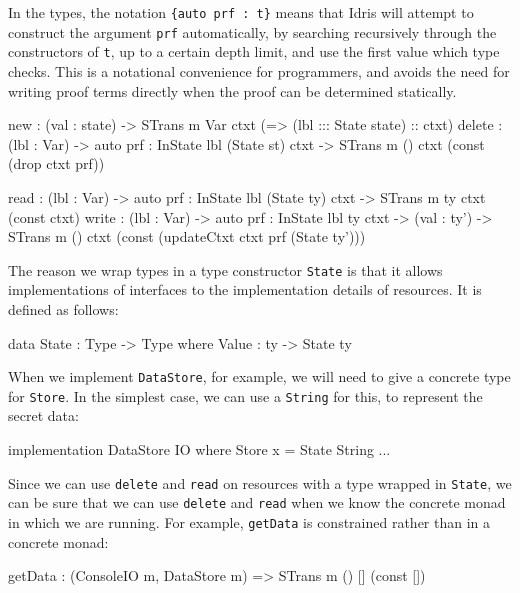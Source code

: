 In the types, the notation \texttt{\{auto prf : t\}} means that Idris will
attempt to construct the argument \texttt{prf} automatically, by searching
recursively through the constructors of \texttt{t}, up to a certain depth
limit, and use the first value which type checks. This is a notational
convenience for programmers, and avoids the need for writing proof terms
directly when the proof can be determined statically.

\small
\begin{code}[float=h, frame=single,caption={Primitive operations in
\texttt{STrans} for creating, deleting, reading and writing resources},label=fig:stransprims]
new : (val : state) -> 
      STrans m Var ctxt (\lbl => (lbl ::: State state) :: ctxt)
delete : (lbl : Var) ->
         {auto prf : InState lbl (State st) ctxt} ->
         STrans m () ctxt (const (drop ctxt prf))

read : (lbl : Var) ->
       {auto prf : InState lbl (State ty) ctxt} ->
       STrans m ty ctxt (const ctxt)
write : (lbl : Var) ->
        {auto prf : InState lbl ty ctxt} ->
        (val : ty') ->
        STrans m () ctxt (const (updateCtxt ctxt prf (State ty')))
\end{code}
\normalsize

The reason we wrap types in a type constructor \texttt{State} is that it
allows implementations of interfaces to  the implementation details
of resources.  It is defined as follows:

\small
\begin{code}
data State : Type -> Type where
     Value : ty -> State ty
\end{code}
\normalsize

When we implement \texttt{DataStore}, for example, we will need to give
a concrete type for \texttt{Store}. In the simplest case, we can use a
\texttt{String} for this, to represent the secret data:

\small
\begin{code}
implementation DataStore IO where
  Store x = State String
  ...
\end{code}
\normalsize

Since we can  use \texttt{delete} and \texttt{read} on
resources with a type wrapped in \texttt{State}, we can be sure that
we can  use \texttt{delete} and \texttt{read} when we know
the concrete monad in which we are running.
For example, \texttt{getData} is constrained rather than in a
concrete monad:

\small
\begin{code}
getData : (ConsoleIO m, DataStore m) => STrans m () [] (const [])
\end{code}
\normalsize

